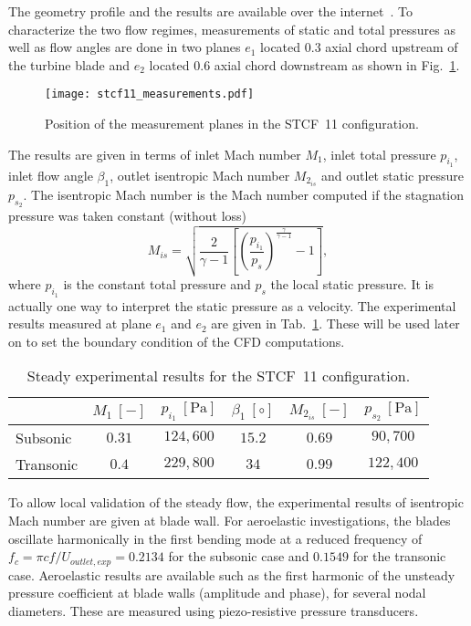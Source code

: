 The geometry profile and the results are available over the
internet~\cite{stcf11web}. 
To characterize the two flow regimes, measurements of static and total pressures 
as well as flow angles are done in two planes $e_1$ located $0.3$ axial chord upstream 
of the turbine
blade and $e_2$ located $0.6$ axial chord downstream
as shown in Fig.~\ref{fig:stcf11_measurements}.
\begin{figure}[htp]
  \centering
  \texttt{[image: stcf11\_measurements.pdf]}
  \caption{Position of the measurement planes in the STCF~11 configuration.}
  \label{fig:stcf11_measurements}
\end{figure}
The results are given in terms of
inlet Mach number $M_1$, inlet total pressure $p_{i_1}$, 
inlet flow angle $\beta_1$, outlet isentropic
Mach number $M_{2_{is}}$ and outlet static pressure $p_{s_2}$. 
The isentropic Mach number is the Mach number 
computed if the stagnation pressure was taken constant (without loss)
\begin{equation}
    M_{is} = \sqrt{\frac{2}{\gamma -1}
        \left[\left( \frac{p_{i_1}}{p_s} \right)^{\frac{\gamma}{\gamma -1}}  
        - 1 \right]},
\end{equation}
where $p_{i_1}$ is the constant total pressure and $p_s$
the local static pressure.
It is actually
one way to interpret the static pressure as a velocity.
The experimental results measured at plane $e_1$
and $e_2$ are given in Tab.~\ref{tab:stcf11_steady_results}. 
These will be used later on to set the boundary condition 
of the CFD computations.
\begin{table}[htp]
   \centering
  \begin{tabular}{lccccc}
    \toprule
    \phantom{abdefghijk}& $M_1~[-]$ & $p_{i_1}~[\text{Pa}]$ & $\beta_1~[\circ]$ & $M_{2_{is}}~[-]$ & $p_{s_2}~[\text{Pa}]$ \\
    \midrule
    Subsonic & $0.31$ & $124,600$ & $15.2$ & $0.69$  & $90,700$ \\
    Transonic & $0.4$ & $229,800$ & $34$    & $0.99$ & $122,400$ \\
    \bottomrule
  \end{tabular}
  \caption{Steady experimental results for the STCF~11 configuration.}
  \label{tab:stcf11_steady_results}
\end{table} 

To allow local validation of the steady
flow, the experimental results of 
isentropic Mach number are given at blade wall.
For aeroelastic investigations, the blades oscillate harmonically in the first bending mode
at a reduced frequency of $f_{c} =\pi c f/U_{outlet, exp} = 0.2134$ 
for the subsonic case and $0.1549$ for the
transonic case. Aeroelastic
results are available such as the first harmonic of the unsteady pressure
coefficient at blade walls (amplitude and phase), for several nodal
diameters. These are measured using piezo-resistive pressure transducers.

